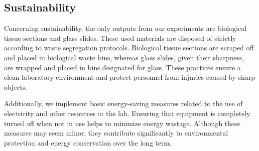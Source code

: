 \subsection{Sustainability}

Concerning sustainability, the only outputs from our experiments are biological tissue sections and glass slides. These used materials are disposed of strictly according to waste segregation protocols. Biological tissue sections are scraped off and placed in biological waste bins, whereas glass slides, given their sharpness, are wrapped and placed in bins designated for glass. These practices ensure a clean laboratory environment and protect personnel from injuries caused by sharp objects.

Additionally, we implement basic energy-saving measures related to the use of electricity and other resources in the lab. Ensuring that equipment is completely turned off when not in use helps to minimize energy wastage. Although these measures may seem minor, they contribute significantly to environmental protection and energy conservation over the long term.










